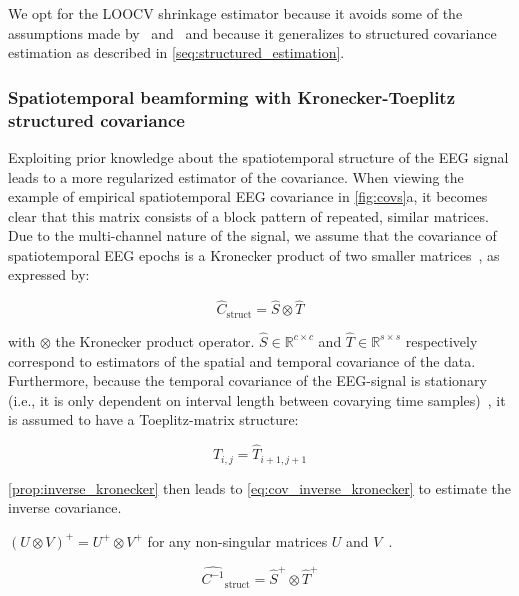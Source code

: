 We opt for the LOOCV shrinkage estimator because it avoids some of the
assumptions made by~\cite{LEDOIT2004365} and~\cite{chen2010shrinkage} and
because it generalizes to structured covariance estimation as described in
\autoref{seq:structured_estimation}.

\subsubsection{Spatiotemporal beamforming with Kronecker-Toeplitz structured covariance}
\label{seq:structured_estimation}
Exploiting prior knowledge about the spatiotemporal structure of the EEG signal leads to a more regularized estimator of the covariance.
When viewing the example of empirical spatiotemporal EEG covariance in
\autoref{fig:covs}a, it becomes clear that this matrix consists of a block pattern of repeated, similar matrices.
Due to the multi-channel nature of the signal, we assume that the covariance of spatiotemporal EEG epochs is a Kronecker
product of two smaller
matrices~\cite{Munck1992,DeMunck1999,huizenga2002spatiotemporal}, as expressed
by:

	\begin{equation}
		\hat{C}_\text{struct} = \hat{S} \otimes \hat{T}
		\label{eq:kronecker}
	\end{equation}

with $\otimes$ the Kronecker product operator.
$\hat{S} \in \mathbb{R}^{c\times c}$ and $\hat{T} \in \mathbb{R}^{s\times s}$ respectively correspond to estimators of the spatial and temporal covariance of the data.
Furthermore, because the temporal covariance of the EEG-signal is
stationary (i.e., it is only dependent on interval length between covarying
time samples)~\cite{Bijma2003}, it is assumed to have a Toeplitz-matrix structure:

	\begin{equation}
		\hat{T}_{i,j} = \hat{T}_{i+1,j+1}
		\label{eq:toeplitz}
	\end{equation}

\autoref{prop:inverse_kronecker} then leads to
\autoref{eq:cov_inverse_kronecker} to estimate the inverse
covariance.
\begin{property}
	$(U \otimes V)^+ = U^+ \otimes V^+$ for any non-singular
	matrices $U$ and $V$~\cite{Langville2004}.
	\label{prop:inverse_kronecker}
\end{property}

	\begin{equation}
		\widehat{C^{-1}}_\text{struct} = \hat{S}^+ \otimes \hat{T}^+
	\label{eq:cov_inverse_kronecker}
	\end{equation}

